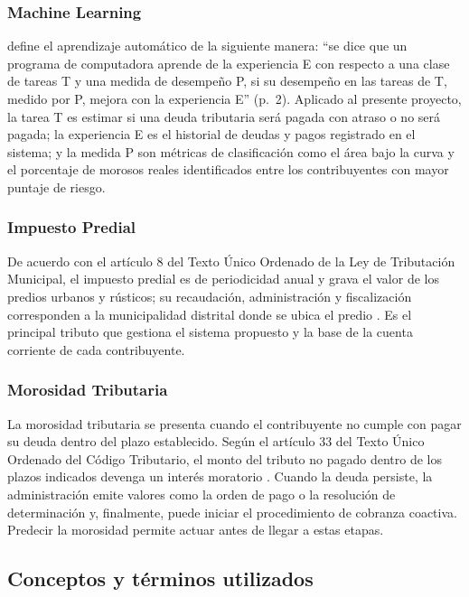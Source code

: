 \documentclass[12pt,a4paper]{report}
\begin{document}
\subsubsection{Machine Learning}
\textcite{mitchell1997} define el aprendizaje automático de la siguiente manera: ``se dice que un programa de computadora aprende de la experiencia E con respecto a una clase de tareas T y una medida de desempeño P, si su desempeño en las tareas de T, medido por P, mejora con la experiencia E'' (p.~2). Aplicado al presente proyecto, la tarea T es estimar si una deuda tributaria será pagada con atraso o no será pagada; la experiencia E es el historial de deudas y pagos registrado en el sistema; y la medida P son métricas de clasificación como el área bajo la curva y el porcentaje de morosos reales identificados entre los contribuyentes con mayor puntaje de riesgo.

\subsubsection{Impuesto Predial}
De acuerdo con el artículo 8 del Texto Único Ordenado de la Ley de Tributación Municipal, el impuesto predial es de periodicidad anual y grava el valor de los predios urbanos y rústicos; su recaudación, administración y fiscalización corresponden a la municipalidad distrital donde se ubica el predio \parencite{tuoltm}. Es el principal tributo que gestiona el sistema propuesto y la base de la cuenta corriente de cada contribuyente.

\subsubsection{Morosidad Tributaria}
La morosidad tributaria se presenta cuando el contribuyente no cumple con pagar su deuda dentro del plazo establecido. Según el artículo 33 del Texto Único Ordenado del Código Tributario, el monto del tributo no pagado dentro de los plazos indicados devenga un interés moratorio \parencite{codigotributario}. Cuando la deuda persiste, la administración emite valores como la orden de pago o la resolución de determinación y, finalmente, puede iniciar el procedimiento de cobranza coactiva. Predecir la morosidad permite actuar antes de llegar a estas etapas.

\subsection{Conceptos y términos utilizados}
\end{document}
